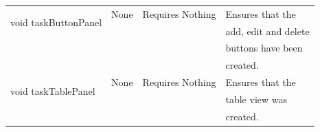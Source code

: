 \begin{tabular}{| l | l | l | l |}
\\
\hline
\multirow{2}{*}{void taskButtonPanel} & None & Requires Nothing & Ensures that the\\
		 	                            &          &                             & add, edit and delete\\
                                                                &          &                             & buttons have been\\
					    &          &                             & created.
\\
\hline
\multirow{2}{*}{void taskTablePanel} & None & Requires Nothing & Ensures that the\\
		 	                         &           &                             & table view was\\
				             &           &                             & created.
\\
\hline
\end{tabular}

